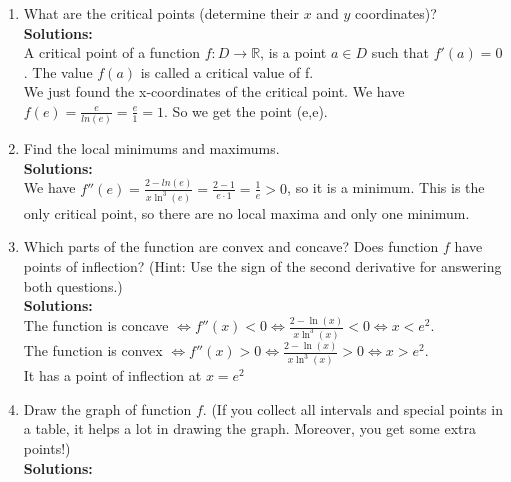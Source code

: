 \documentclass[a4paper]{article}
\begin{document}
\begin{enumerate}
\begin{enumerate}
	
	
	\item What are the critical points (determine their $x$ and $y$ coordinates)?\\
	\textbf{Solutions:}\\
	
A critical point of a function $f: D \rightarrow \mathbb{R}$, is a point $a \in D$ such that $f'(a) = 0$. The value $f(a)$ is called a critical value of f.\\

We just found the x-coordinates of the critical point. We have $f(e) = \frac{e}{ln(e)} = \frac{e}{1} = 1$. So we get the point (e,e).\\



	
	
	
	
	\item Find the local minimums and maximums.\\
	\textbf{Solutions:}\\
	
We have $f''(e) = \frac{2 - ln(e)}{x \ln^3(e)} = \frac{2 - 1}{e \cdot 1} = \frac{1}{e} > 0$, so it is a minimum. This is the only critical point, so there are no local maxima and only one minimum.\\	
	
	
	
	\item Which parts of the function are convex and concave? Does function $f$ have points of inflection? (Hint: Use the sign of the second derivative for answering both questions.)\\
	\textbf{Solutions:}\\
	
	The function is concave $\Longleftrightarrow f''(x) < 0 \Longleftrightarrow \frac{2 -  \ln(x)}{x \ln^3(x)} < 0 \Longleftrightarrow x < e^2$.\\
	The function is convex $\Longleftrightarrow f''(x) > 0 \Longleftrightarrow \frac{2 -  \ln(x)}{x \ln^3(x)} > 0 \Longleftrightarrow x > e^2$.\\
	It has a point of inflection at $x = e^2$\\
	
	\item Draw the graph of function $f$. (If you collect all intervals and special points in a table, it helps a lot in drawing the graph. Moreover, you get some extra points!)\\
	\textbf{Solutions:}\\	
	

\end{enumerate}
\end{enumerate}
\end{document}
